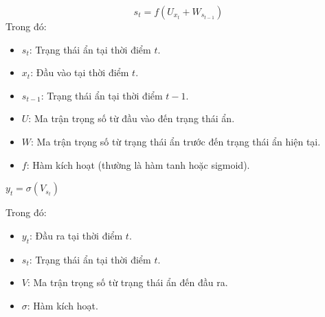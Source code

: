 \documentclass[conference]{IEEEtran}
\begin{document}
\[s_{t} = f(U_{x_{t}} + W_{s_{t-1}})\]
Trong đó:
\begin{itemize}
    \item \( s_t \): Trạng thái ẩn tại thời điểm \( t \).
    \item \( x_{t} \): Đầu vào tại thời điểm \( t \).
    \item \( s_{t-1} \): Trạng thái ẩn tại thời điểm \( t-1 \).
    \item \( U \): Ma trận trọng số từ đầu vào đến trạng thái ẩn.
    \item \( W \): Ma trận trọng số từ trạng thái ẩn trước đến trạng thái ẩn hiện tại.
    \item \( f \): Hàm kích hoạt (thường là hàm tanh hoặc sigmoid).
\end{itemize}
\begin{center}
    \(y_t = \sigma(V_{s_{t}})\)
\end{center}
Trong đó:
\begin{itemize}
    \item \( y_t \): Đầu ra tại thời điểm \( t \).
    \item \( s_{t} \): Trạng thái ẩn tại thời điểm \( t \).
    \item \( V \): Ma trận trọng số từ trạng thái ẩn đến đầu ra.
    \item $\sigma$: Hàm kích hoạt. 
\end{itemize}
\end{document}
